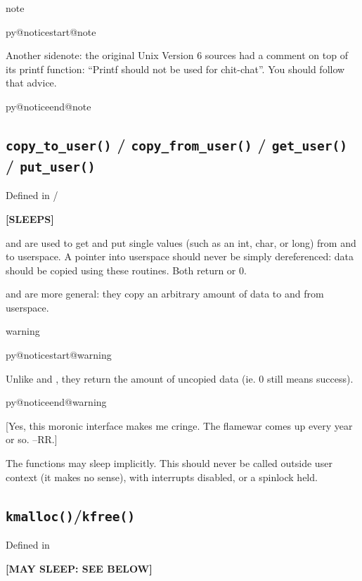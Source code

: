 \documentclass[a4paper,8pt,english]{sphinxmanual}
\makeatletter
\renewenvironment{notice}[2]{%
          \def\py@noticetype{#1}
          \begin{coloredbox}{#1}
          \bf\it
          \par\strong{#2}
          \csname py@noticestart@#1\endcsname
        }
	{
          \csname py@noticeend@\py@noticetype\endcsname
          \end{coloredbox}
        }
\makeatother
\begin{document}
\begin{notice}{note}{Note:}
Another sidenote: the original Unix Version 6 sources had a comment
on top of its printf function: ``Printf should not be used for
chit-chat''. You should follow that advice.
\end{notice}


\subsection{\texttt{copy\_to\_user()} / \texttt{copy\_from\_user()} / \texttt{get\_user()} / \texttt{put\_user()}}
\label{kernel-hacking/hacking:copy-to-user-copy-from-user-get-user-put-user}
Defined in  / 

\textbf{{[}SLEEPS{]}}

 and  are used to get
and put single values (such as an int, char, or long) from and to
userspace. A pointer into userspace should never be simply dereferenced:
data should be copied using these routines. Both return  or
0.

 and  are
more general: they copy an arbitrary amount of data to and from
userspace.

\begin{notice}{warning}{Warning:}
Unlike  and , they
return the amount of uncopied data (ie. 0 still means success).
\end{notice}

{[}Yes, this moronic interface makes me cringe. The flamewar comes up
every year or so. --RR.{]}

The functions may sleep implicitly. This should never be called outside
user context (it makes no sense), with interrupts disabled, or a
spinlock held.


\subsection{\texttt{kmalloc()}/\texttt{kfree()}}
\label{kernel-hacking/hacking:kmalloc-kfree}
Defined in 

\textbf{{[}MAY SLEEP: SEE BELOW{]}}
\end{document}
